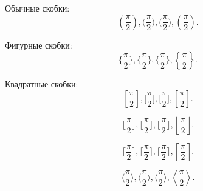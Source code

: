 \documentclass[a4paper, 12pt]{article}
\begin{document}
    Обычные скобки:
    \[
        (\frac{\pi}2), %
        \big( \frac{\pi}2 \big), %
        \bigg( \frac{\pi}2 \bigg), %
        \left( \frac{\pi}2 \right). %
    \]

    Фигурные скобки:
    \[
        \{\frac{\pi}2\}, %
        \big\{ \frac{\pi}2 \big\}, %
        \bigg\{ \frac{\pi}2 \bigg\}, %
        \left\{ \frac{\pi}2 \right\}. %
    \]

    Квадратные скобки:
    \[
        [\frac{\pi}2], %
        \big[ \frac{\pi}2 \big], %
        \bigg[ \frac{\pi}2 \bigg], %
        \left[ \frac{\pi}2 \right]. %
    \]

    \[
        \lfloor\frac{\pi}2\rfloor, %
        \big\lfloor \frac{\pi}2 \big\rfloor, %
        \bigg\lfloor \frac{\pi}2 \bigg\rfloor, %
        \left\lfloor \frac{\pi}2 \right\rfloor. %
    \]

    \[
        \lceil\frac{\pi}2\rceil, %
        \big\lceil \frac{\pi}2 \big\rceil, %
        \bigg\lceil \frac{\pi}2 \bigg\rceil, %
        \left\lceil \frac{\pi}2 \right\rceil. %
    \]

    \[
        \langle\frac{\pi}2\rangle, %
        \big\langle \frac{\pi}2 \big\rangle, %
        \bigg\langle \frac{\pi}2 \bigg\rangle, %
        \left\langle \frac{\pi}2 \right\rangle. %
    \]
\end{document}
